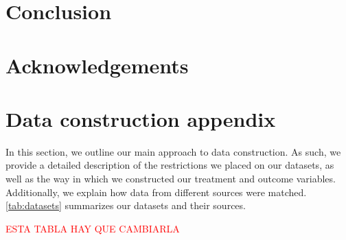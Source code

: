 \documentclass[12pt, a4paper]{article}
\begin{document}
\section{Conclusion} \label{sec:conclusion}


\newpage

\section{Acknowledgements}


\newpage



\newpage
\appendix
{}

\section{Data construction appendix \label{sec:data_appendix}}

In this section, we outline our main approach to data construction. As such, we provide a detailed description of the restrictions we placed on our datasets, as well as the way in which we constructed our treatment and outcome variables. Additionally, we explain how data from different sources were matched. \autoref{tab:datasets} summarizes our datasets and their sources.

\textcolor{red}{ESTA TABLA HAY QUE CAMBIARLA}
\begin{table}[H]
  \centering
  \caption{Datasets}
  \label{tab:datasets}%
\end{table}%
\end{document}
